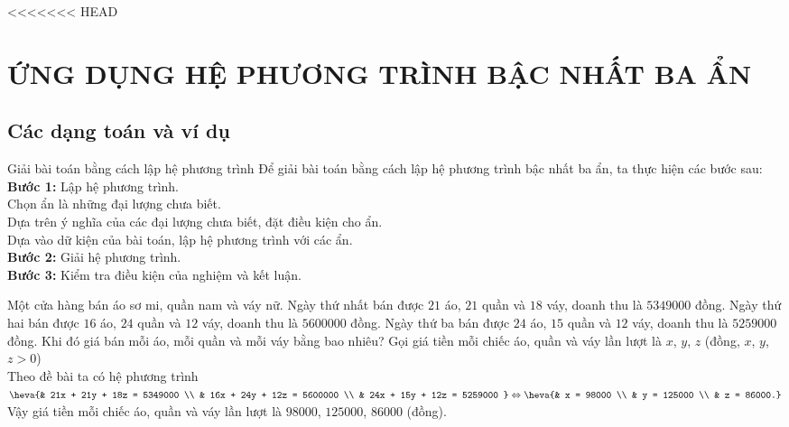 <<<<<<< HEAD
\section{ỨNG DỤNG HỆ PHƯƠNG TRÌNH BẬC NHẤT BA ẨN}
\subsection{Các dạng toán và ví dụ}
\begin{dang}{Giải bài toán bằng cách lập hệ phương trình}
	Để giải bài toán bằng cách lập hệ phương trình bậc nhất ba ẩn, ta thực hiện các bước sau:\\
	\textbf{Bước 1: }Lập hệ phương trình.\\
	Chọn ẩn là những đại lượng chưa biết.\\
	Dựa trên ý nghĩa của các đại lượng chưa biết, đặt điều kiện cho ẩn.\\
	Dựa vào dữ kiện của bài toán, lập hệ phương trình với các ẩn.\\
	\textbf{Bước 2:} Giải hệ phương trình.\\
	\textbf{Bước 3: }Kiểm tra điều kiện của nghiệm và kết luận.
	\end{dang}
\begin{vd}%
	Một cửa hàng bán áo sơ mi, quần nam và váy nữ. Ngày thứ nhất bán được $21$ áo, $21$ quần và $18$ váy, doanh thu là $5349000$ đồng. Ngày thứ hai bán được $16$ áo, $24$ quần và $12$ váy, doanh thu là $5600000$ đồng. Ngày thứ ba bán được $24$ áo, $15$ quần và $12$ váy, doanh thu là $5259000$ đồng. Khi đó giá bán mỗi áo, mỗi quần và mỗi váy bằng bao nhiêu?	\loigiai
	{		Gọi giá tiền mỗi chiếc áo, quần và váy lần lượt là $x$, $y$, $z$ \big(đồng, $ x$, $y$, $z > 0$\big) \\
		Theo đề bài ta có hệ phương trình $ \heva{& 21x + 21y + 18z = 5349000 \\ & 16x + 24y + 12z = 5600000 \\ & 24x + 15y + 12z = 5259000 } \Leftrightarrow \heva{& x = 98000 \\ & y = 125000 \\ & z = 86000.} $ \\
		Vậy giá tiền mỗi chiếc áo, quần và váy lần lượt là $ 98000$, $125000$, $86000 $ \big(đồng\big).
	}
\end{vd}
